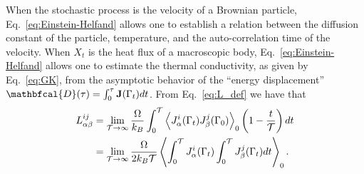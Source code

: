 When the stochastic process is the velocity of a Brownian particle, Eq.~\eqref{eq:Einstein-Helfand} allows one to establish a relation between the diffusion constant of the particle, temperature, and the auto-correlation time of the velocity.  When $X_t$ is the heat flux of a macroscopic body, Eq.~\eqref{eq:Einstein-Helfand} allows one to estimate the thermal conductivity, as given by Eq.~\eqref{eq:GK}, from the asymptotic behavior of the ``energy displacement'' $\mathbfcal{D}(\tau) = \int_0^\tau \mathbf{J}(\rGamma_t) dt $. 
From Eq.~\eqref{eq:L_def} we have that
\begin{align}
    L_{\alpha\beta}^{ij} &= \lim_{\mathcal{T\rightarrow\infty}} \frac{\rOmega}{k_B} \int_0^{\mathcal{T}} \left\langle J^i_\alpha(\rGamma_t) J^j_\beta(\rGamma_0)\right\rangle_0 \left(1 - \frac{t}{\mathcal{T}}\right) dt \nonumber\\
    &= \lim_{\mathcal{T\rightarrow\infty}} \frac{\rOmega}{2k_B\mathcal{T}} \left\langle \int_0^\mathcal{T} J_\alpha^i(\rGamma_t) \int_0^\mathcal{T} J_\beta^j(\rGamma_t) dt \right\rangle_0 .  \label{eq:Einstein-Helfand-Lij}
\end{align}

